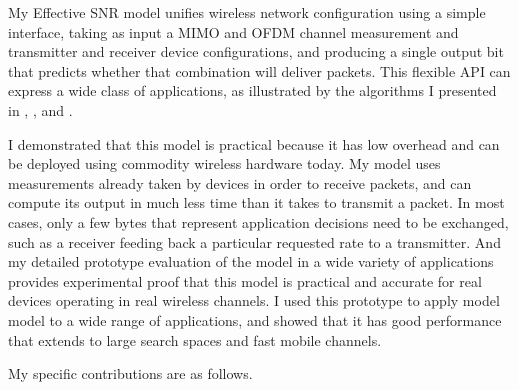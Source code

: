 My Effective SNR model unifies wireless network configuration using a simple interface, taking as input a MIMO and OFDM channel measurement and transmitter and receiver device configurations, and producing a single output bit that predicts whether that combination will deliver packets. This flexible API can express a wide class of applications, as illustrated by the algorithms I presented in , , and .

I demonstrated that this model is practical because it has low overhead and can be deployed using commodity wireless hardware today. My model uses measurements already taken by devices in order to receive packets, and can compute its output in much less time than it takes to transmit a packet. In most cases, only a few bytes that represent application decisions need to be exchanged, such as a receiver feeding back a particular requested rate to a transmitter. And my detailed prototype evaluation of the model in a wide variety of applications provides experimental proof that this model is practical and accurate for real devices operating in real wireless channels. I used this prototype to apply model model to a wide range of applications, and showed that it has good performance that extends to large search spaces and fast mobile channels.

My specific contributions are as follows.

